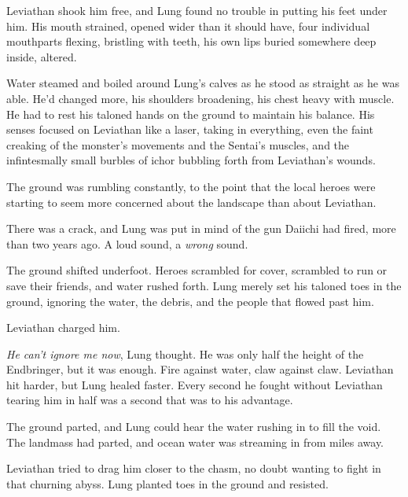 Leviathan shook him free, and Lung found no trouble in putting his feet under him.  His mouth strained, opened wider than it should have, four individual mouthparts flexing, bristling with teeth, his own lips buried somewhere deep inside, altered.



Water steamed and boiled around Lung's calves as he stood as straight as he was able.  He'd changed more, his shoulders broadening, his chest heavy with muscle.  He had to rest his taloned hands on the ground to maintain his balance.  His senses focused on Leviathan like a laser, taking in everything, even the faint creaking of the monster's movements and the Sentai's muscles, and the infintesmally small burbles of ichor bubbling forth from Leviathan's wounds.



The ground was rumbling constantly, to the point that the local heroes were starting to seem more concerned about the landscape than about Leviathan.



There was a crack, and Lung was put in mind of the gun Daiichi had fired, more than two years ago.  A loud sound, a \emph{wrong} sound.



The ground shifted underfoot.  Heroes scrambled for cover, scrambled to run or save their friends, and water rushed forth.  Lung merely set his taloned toes in the ground, ignoring the water, the debris, and the people that flowed past him.



Leviathan charged him.



\emph{He can't ignore me now}, Lung thought.  He was only half the height of the Endbringer, but it was enough.  Fire against water, claw against claw.  Leviathan hit harder, but Lung healed faster.  Every second he fought without Leviathan tearing him in half was a second that was to his advantage.



The ground parted, and Lung could hear the water rushing in to fill the void.  The landmass had parted, and ocean water was streaming in from miles away.



Leviathan tried to drag him closer to the chasm, no doubt wanting to fight in that churning abyss.  Lung planted toes in the ground and resisted.



